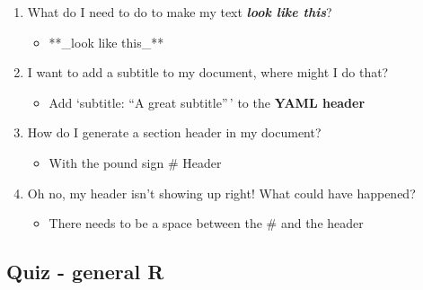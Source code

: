 \documentclass[
]{book}
\providecommand{\tightlist}{%
  \setlength{\itemsep}{0pt}\setlength{\parskip}{0pt}}
\begin{document}
\begin{enumerate}
\def\labelenumi{\arabic{enumi}.}
\tightlist
\item
  What do I need to do to make my text \textbf{\emph{look like this}}?

  \begin{itemize}
  \tightlist
  \item
    **\_look like this\_**
  \end{itemize}
\item
  I want to add a subtitle to my document, where might I do that?

  \begin{itemize}
  \tightlist
  \item
    Add `subtitle: ``A great subtitle''\,' to the \textbf{YAML header}
  \end{itemize}
\item
  How do I generate a section header in my document?

  \begin{itemize}
  \tightlist
  \item
    With the pound sign \# Header
  \end{itemize}
\item
  Oh no, my header isn't showing up right! What could have happened?

  \begin{itemize}
  \tightlist
  \item
    There needs to be a space between the \# and the header
  \end{itemize}
\end{enumerate}

\subsection{Quiz - general R}\label{quiz---general-r}
\end{document}
